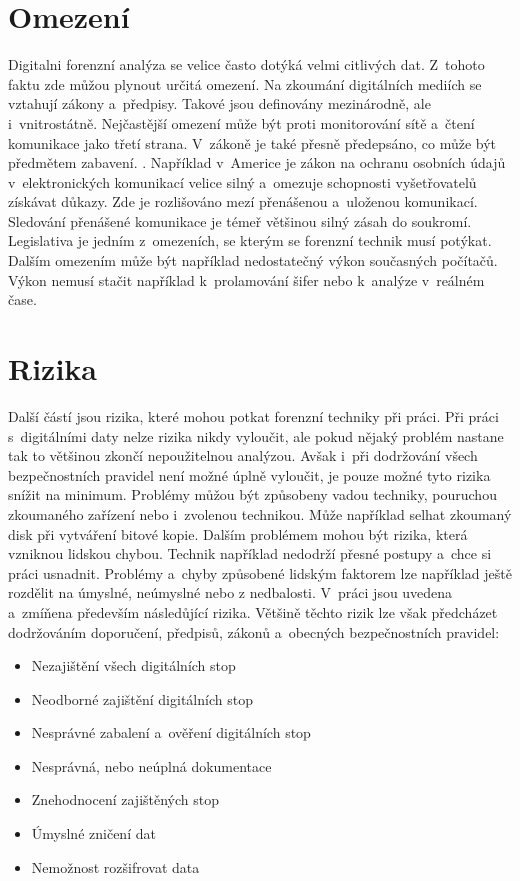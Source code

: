 \documentclass[thesis=B,czech]{FITthesis}[2012/06/26]
\begin{document}
\section{Omezení}

Digitalni forenzní analýza se velice často dotýká velmi citlivých dat. Z~tohoto faktu zde můžou plynout určitá omezení. Na zkoumání  digitálních mediích se vztahují zákony a~předpisy. Takové jsou definovány mezinárodně, ale i~vnitrostátně. Nejčastější omezení může být proti monitorování sítě a~čtení komunikace jako třetí strana. V~zákoně je také přesně předepsáno, co může být předmětem zabavení. \cite{for_wi}. Například v~Americe je zákon na ochranu osobních údajů v~elektronických komunikací velice silný a~omezuje schopnosti vyšetřovatelů získávat důkazy. Zde je rozlišováno mezí přenášenou a~uloženou komunikací. Sledování přenášené komunikace je témeř většinou silný zásah do soukromí. Legislativa je jedním z~omezeních, se kterým se forenzní technik musí potýkat. Dalším omezením může být například nedostatečný výkon současných počítačů. Výkon nemusí stačit například k~prolamování šifer nebo k~analýze v~reálném čase. 


\section{Rizika}
Další částí jsou rizika, které mohou potkat forenzní techniky při práci. Při práci s~digitálními daty nelze rizika nikdy vyloučit, ale pokud nějaký problém nastane tak to většinou zkončí nepoužitelnou analýzou. Avšak i~při dodržování všech bezpečnostních pravidel není možné úplně vyloučit, je pouze možné tyto rizika snížit na minimum. Problémy můžou být způsobeny vadou techniky, pouruchou zkoumaného zařízení nebo i~zvolenou technikou. Může například selhat zkoumaný disk při vytváření bitové kopie. Dalším problémem mohou být rizika, která vzniknou lidskou chybou. Technik například nedodrží přesné postupy a~chce si práci usnadnit. Problémy a~chyby způsobené lidským faktorem lze například ještě rozdělit na úmyslné, neúmyslné nebo z nedbalosti. V~práci \cite{for_baka} jsou uvedena a~zmíňena především následůjící rizika. Většině těchto rizik lze však předcházet dodržováním doporučení, předpisů, zákonů a~obecných bezpečnostních pravidel:

\begin{itemize}
\item Nezajištění všech digitálních stop
\item Neodborné zajištění digitálních stop
\item Nesprávné zabalení a~ověření digitálních stop
\item Nesprávná, nebo neúplná dokumentace
\item Znehodnocení zajištěných stop
\item Úmyslné zničení dat
\item Nemožnost rozšifrovat data

\end{itemize}
\end{document}
